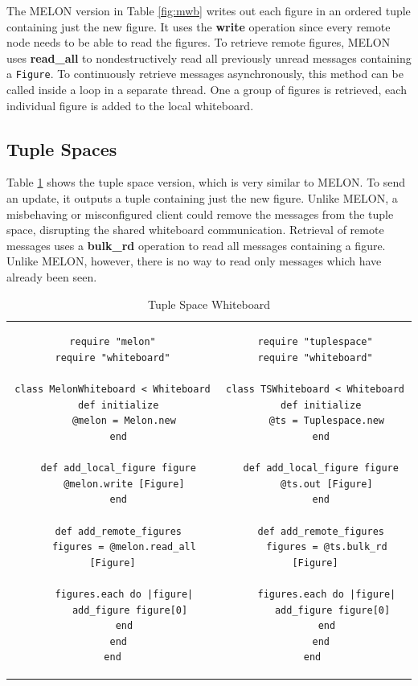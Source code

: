 \documentclass{llncs}
\begin{document}
The MELON version in Table \ref{fig:mwb} writes out each figure in an ordered tuple containing just the new figure. It uses the \textbf{write} operation since every remote node needs to be able to read the figures. To retrieve remote figures, MELON uses \textbf{read\_all} to nondestructively read all previously unread messages containing a \texttt{Figure}. To continuously retrieve messages asynchronously, this method can be called inside a loop in a separate thread. One a group of figures is retrieved, each individual figure is added to the local whiteboard. 

\subsection{Tuple Spaces}

Table \ref{fig:tswb} shows the tuple space version, which is very similar to MELON. To send an update, it outputs a tuple containing just the new figure. Unlike MELON, a misbehaving or misconfigured client could remove the messages from the tuple space, disrupting the shared whiteboard communication. Retrieval of remote messages uses a \textbf{bulk_rd} operation to read all messages containing a figure. Unlike MELON, however, there is no way to read only messages which have already been seen. 

\begin{table}
\centering
\begin{tabular}{c c}
\begin{minipage}{2.75in}
\begin{verbatim}
require "melon"
require "whiteboard"

class MelonWhiteboard < Whiteboard
  def initialize
    @melon = Melon.new
  end
  
  def add_local_figure figure
    @melon.write [Figure]
  end

  def add_remote_figures
    figures = @melon.read_all [Figure]

    figures.each do |figure|
      add_figure figure[0]
    end
  end
end
\end{verbatim}
\caption{MELON Whiteboard}
\end{minipage}\label{fig:mwb}
&
\begin{minipage}{2.5in}
\begin{verbatim}
require "tuplespace"
require "whiteboard"

class TSWhiteboard < Whiteboard
  def initialize
    @ts = Tuplespace.new
  end

  def add_local_figure figure
    @ts.out [Figure]
  end

  def add_remote_figures
    figures = @ts.bulk_rd [Figure]

    figures.each do |figure|
      add_figure figure[0]
    end
  end
end	
\end{verbatim}
\caption{Tuple Space Whiteboard}
\end{minipage}\label{fig:tswb}
\end{tabular}
\end{table}
\end{document}
